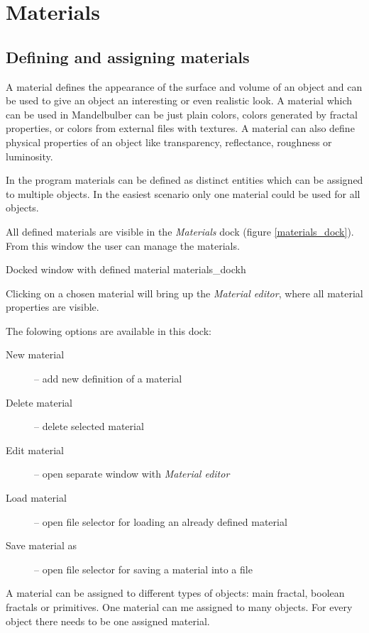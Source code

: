 \section{Materials}\label{materials}

\subsection{Defining and assigning materials}\label{defining-materials}

A material defines the appearance of the surface and volume of an object and can be used to give an object an interesting or even realistic look. A material which can be used in Mandelbulber can be just plain colors, colors generated by fractal properties, or colors from external files with textures. A material can also define physical properties of an object like transparency, reflectance, roughness or luminosity. 

In the program materials can be defined as distinct entities which can be assigned to multiple objects. In the easiest scenario only one material could be used for all objects.

All defined materials are visible in the \emph{Materials} dock (figure \ref{materials_dock}).
From this window the user can manage the materials.

{Docked window with defined material}
{materials_dock}{h}

Clicking on a chosen material will bring up the \emph{Material editor}, where all material properties are visible.

The folowing options are available in this dock:

\begin{description}
		\item[New material] -- add new definition of a material
		\item[Delete material] -- delete selected material
		\item[Edit material] -- open separate window with \emph{Material editor}
		\item[Load material] -- open file selector for loading an already defined material
		\item[Save material as] -- open file selector for saving a material into a file
\end{description}

A material can be assigned to different types of objects: main fractal, boolean fractals or primitives. One material can me assigned to many objects. For every object there needs to be one assigned material.

